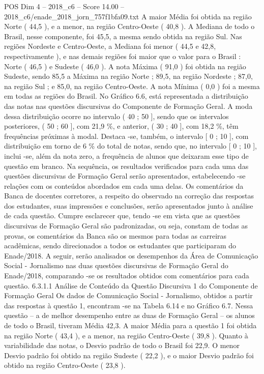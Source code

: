 \begin{textsample}{POS Dim 4 – 2018\_c6 – Score 14.00 – 2018\_c6/enade\_2018\_jorn\_757f1bfa09.txt}
A maior Média foi obtida na região Norte ( 44,5 ), e a menor, na região Centro-Oeste ( 40,8 ).
A Mediana de todo o Brasil, nesse componente, foi 45,5, a mesma sendo obtida na região Sul.
Nas regiões Nordeste e Centro-Oeste, a Mediana foi menor ( 44,5 e 42,8, respectivamente ), e nas demais regiões foi maior que o valor para o Brasil : Norte ( 46,5 ) e Sudeste ( 46,0 ).
A nota Máxima ( 91,0 ) foi obtida na região Sudeste, sendo 85,5 a Máxima na região Norte ; 89,5, na região Nordeste ; 87,0, na região Sul ; e 85,0, na região Centro-Oeste.
A nota Mínima ( 0,0 ) foi a mesma em todas as regiões do Brasil.
No Gráfico 6.6, está representada a distribuição das notas nas questões discursivas do Componente de Formação Geral.
A moda dessa distribuição ocorre no intervalo ( 40 ; 50 ], sendo que os intervalos posteriores, ( 50 ; 60 ], com 21,9 \%, e anterior, ( 30 ; 40 ], com 18,2 \%, têm frequências próximas à modal.
Destaca -se, também, o intervalo [ 0 ; 10 ], com distribuição em torno de 6 \% do total de notas, sendo que, no intervalo [ 0 ; 10 ], inclui -se, além da nota zero, a frequência de alunos que deixaram esse tipo de questão em branco.
Na sequência, os resultados verificados para cada uma das questões discursivas de Formação Geral serão apresentados, estabelecendo -se relações com os conteúdos abordados em cada uma delas.
Os comentários da Banca de docentes corretores, a respeito do observado na correção das respostas dos estudantes, suas impressões e conclusões, serão apresentados junto à análise de cada questão.
Cumpre esclarecer que, tendo -se em vista que as questões discursivas de Formação Geral são padronizadas, ou seja, constam de todas as provas, os comentários da Banca são os mesmos para todas as carreiras acadêmicas, sendo direcionados a todos os estudantes que participaram do Enade/2018.
A seguir, serão analisados os desempenhos da Área de Comunicação Social - Jornalismo nas duas questões discursivas de Formação Geral do Enade/2018, comparando -se os resultados obtidos com comentários para cada questão. 6.3.1.1 Análise de Conteúdo da Questão Discursiva 1 do Componente de Formação Geral Os dados de Comunicação Social - Jornalismo, obtidos a partir das respostas à questão 1, encontram -se na Tabela 6.14 e no Gráfico 6.7.
Nessa questão – a de melhor desempenho entre as duas de Formação Geral – os alunos de todo o Brasil, tiveram Média 42,3.
A maior Média para a questão 1 foi obtida na região Norte ( 43,4 ), e a menor, na região Centro-Oeste ( 39,8 ).
Quanto à variabilidade das notas, o Desvio padrão de todo o Brasil foi 22,9.
O menor Desvio padrão foi obtido na região Sudeste ( 22,2 ), e o maior Desvio padrão foi obtido na região Centro-Oeste ( 23,8 ).

\end{textsample}
